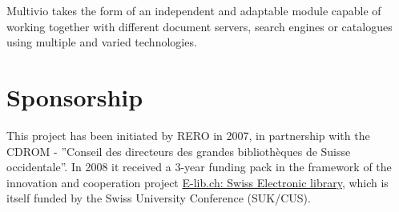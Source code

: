 \documentclass [a4paper]{article}
\begin{document}
Multivio takes the form of an independent and adaptable module capable of
working together with different document servers, search engines or catalogues
using multiple and varied technologies.

\section{Sponsorship}

This project has been initiated by RERO in 2007, in partnership with the CDROM
- ''Conseil des directeurs des grandes bibliothèques de Suisse occidentale''.
In 2008 it received a 3-year funding pack in the framework of the innovation
and cooperation project \href{http://www.e-lib.ch/}{E-lib.ch: Swiss Electronic
library}, which is itself funded by the Swiss University Conference (SUK/CUS).
\end{document}
